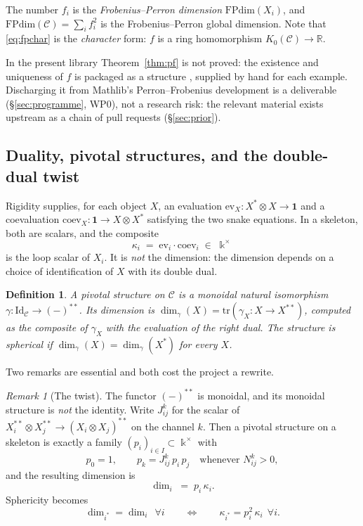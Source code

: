 \documentclass[11pt,a4paper]{article}
\newtheorem{definition}[theorem]{Definition}
\theoremstyle{remark}
\newtheorem{remark}[theorem]{Remark}
\newcommand{\code}[1]{\texttt{\detokenize{#1}}}
\newcommand{\C}{\mathcal{C}}
\newcommand{\Id}{\mathrm{Id}}
\newcommand{\FPdim}{\mathrm{FPdim}}
\newcommand{\one}{\mathbf{1}}
\newcommand{\dual}[1]{#1^{*}}
\newcommand{\field}{\Bbbk}
\newcommand{\R}{\mathbb{R}}
\begin{document}
The number $f_i$ is the \emph{Frobenius--Perron dimension} $\FPdim(X_i)$, and
$\FPdim(\C) = \sum_i f_i^2$ is the Frobenius--Perron global dimension. Note that
\eqref{eq:fpchar} is the \emph{character} form: $f$ is a ring homomorphism $K_0(\C) \to \R$.

In the present library Theorem~\ref{thm:pf} is not proved: the existence and uniqueness of $f$
is packaged as a structure \code{FPData}, supplied by hand for each example. Discharging it from
Mathlib's Perron--Frobenius development is a deliverable (\S\ref{sec:programme}, WP0), not a
research risk: the relevant material exists upstream as a chain of pull requests
(\S\ref{sec:prior}).

\subsection{Duality, pivotal structures, and the double-dual twist}\label{sec:pivotaldef}

Rigidity supplies, for each object $X$, an evaluation $\mathrm{ev}_X \colon \dual{X} \otimes X
\to \one$ and a coevaluation $\mathrm{coev}_X \colon \one \to X \otimes \dual{X}$ satisfying the
two snake equations. In a skeleton, both are scalars, and the composite
\[
\kappa_i \;=\; \mathrm{ev}_i \cdot \mathrm{coev}_i \;\in\; \field^\times
\]
is the loop scalar of $X_i$. It is \emph{not} the dimension: the dimension depends on a choice
of identification of $X$ with its double dual.

\begin{definition}
A \emph{pivotal structure} on $\C$ is a monoidal natural isomorphism
$\gamma \colon \Id_\C \to (-)^{**}$. Its \emph{dimension} is
$\dim_\gamma(X) = \mathrm{tr}(\gamma_X \colon X \to X^{**})$, computed as the composite of
$\gamma_X$ with the evaluation of the right dual. The structure is \emph{spherical} if
$\dim_\gamma(X) = \dim_\gamma(\dual{X})$ for every $X$.
\end{definition}

Two remarks are essential and both cost the project a rewrite.

\begin{remark}[The twist]\label{rem:twist}
The functor $(-)^{**}$ is monoidal, and its monoidal structure is \emph{not} the identity. Write
$J_{ij}^{k}$ for the scalar of $X_i^{**} \otimes X_j^{**} \to (X_i \otimes X_j)^{**}$ on the
channel $k$. Then a pivotal structure on a skeleton is exactly a family
$(p_i)_{i \in I} \subset \field^\times$ with
\begin{equation}\label{eq:pivotal}
p_0 = 1, \qquad p_k = J_{ij}^{k}\, p_i\, p_j \quad \text{whenever } N_{ij}^k > 0,
\end{equation}
and the resulting dimension is
\begin{equation}\label{eq:dim}
\dim_i \;=\; p_i \, \kappa_i .
\end{equation}
Sphericity becomes
\begin{equation}\label{eq:sph}
\dim_{i^*} = \dim_i \ \ \forall i
\qquad\Longleftrightarrow\qquad
\kappa_{i^*} = p_i^{2}\, \kappa_i \ \ \forall i .
\end{equation}
\end{remark}
\end{document}
